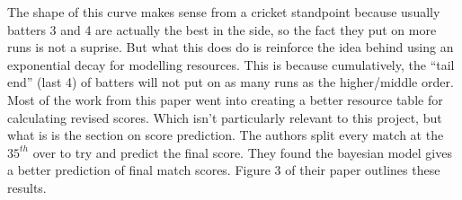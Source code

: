 The shape of this curve makes sense from a cricket standpoint because usually batters 3 and 4 are actually the best in the side, so the fact they put on more runs is not a suprise.
But what this does do is reinforce the idea behind using an exponential decay for modelling resources. This is because cumulatively, the ``tail end'' (last 4) of batters 
will not put on as many runs as the higher/middle order. \\

Most of the work from this paper went into creating a better resource table for calculating revised scores. Which isn't particularly relevant to this project, but what is 
is the section on score prediction. The authors split every match at the $35^{th}$ over to try and predict the final score. They found the bayesian model gives a better
prediction of final match scores. Figure 3 of their paper outlines these results.